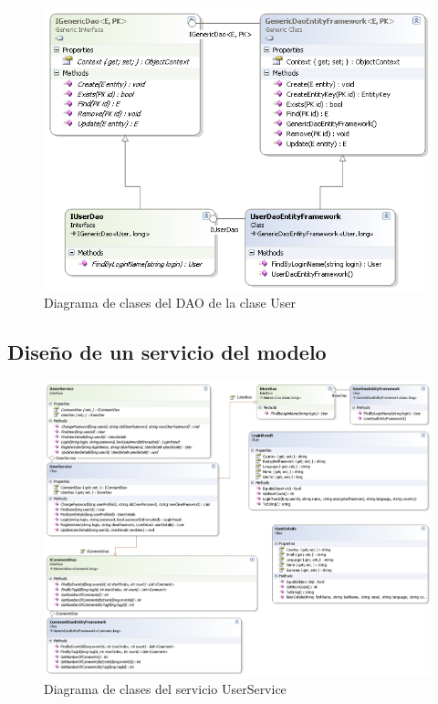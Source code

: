 \documentclass[a4paper,twoside]{article}
\begin{document}
\begin{figure}[H]
  \centering
  \caption{Diagrama de clases del DAO de la clase User}
  \includegraphics[width=.8\textwidth]{img/UML_DAO_implementation.png}
\end{figure}


\newpage
\subsection{Diseño de un servicio del modelo}


\begin{figure}[H]
  \centering
  \caption{Diagrama de clases del servicio UserService}
  \includegraphics[width=1.1\textwidth]{img/UML_Service_implementation.png}
\end{figure}
\end{document}
